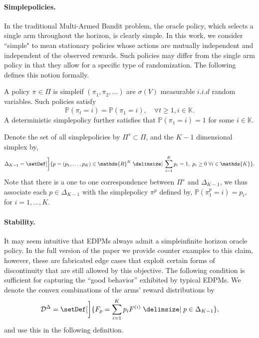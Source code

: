 \documentclass[final,12pt]{colt2018}
\newcommand{\prn}[1]{\left( #1 \right)}
\newcommand{\RR}[1][]{\mathds{R}^{#1}}
\newcommand{\PP}[1]{\mathbb{P}\prn{#1}}
\newcommand{\simple}{simple}
\newcommand{\Simple}{Simple}
\newcommand{\simpleDet}{deterministic simple}
\newcommand{\EDRMabbrv}{EDPM}
\newcommand{\policiesSet}{\Pi}
\newcommand{\statPoliciesSet}{\Pi^s}
\newcommand{\policy}[1][]{\pi^{#1}}
\newcommand{\policyAt}[2][]{\policy[#1]_{#2}}
\newcommand{\statPolicy}[1][p]{\pi^{#1}}
\newcommand{\statPolicyAt}[2][p]{\statPolicy[#1]_{#2}}
\newcommand{\Fp}[1][p]{F_{#1}}
\newcommand{\Fi}[1][i]{F^{\prn{{#1}}}}
\newcommand{\simplex}{\Delta_{K-1}}
\newcommand{\DistSet}{\mathcal{D}}
\newcommand{\DistSetDelta}{\DistSet^{\Delta}}
\newcommand{\actionSet}{\mathds{K}}
\begin{document}
	\paragraph{\Simple\space policies.} In the traditional Multi-Armed Bandit problem, the oracle policy, which selects a single arm throughout the horizon, is clearly \simple. In this work, we consider ``\simple" to mean stationary policies whose actions are mutually independent and independent of the observed rewards. Such policies may differ from the single arm policy in that they allow for a specific type of randomization. The following defines this notion formally. 
	\begin{definition}[\Simple\space policy]
		A policy $\policy \in \policiesSet$ is \simple\space if $\prn{\policyAt{1}, \policyAt{2},\ldots}$ are $\sigma\prn{V}$ measurable $i.i.d$ random variables. Such policies satisfy
		\begin{equation*}
		\PP{\policyAt{t} = i}
		= \PP{\policyAt{1} = i}
		, \quad \forall t \ge 1,i \in \actionSet.
		\end{equation*}
		A \simpleDet\space policy further satisfies that $\PP{\policyAt{1} = i} =1$ for some $i \in \actionSet$.
	\end{definition}
	Denote the set of all \simple\space policies by $\statPoliciesSet \subset \policiesSet$, and the $K-1$ dimensional simplex by,
	\begin{equation*}
	\simplex = \setDef[\bigg]{p = \prn{p_1, \ldots, p_K} \in \RR[K] \given 		\sum_{i=1}^{K}p_i = 1 ,~ p_i \ge 0 ~ \forall i \in \actionSet}.
	\end{equation*}
	Note that there is a one to one correspondence between $\statPoliciesSet$ and $\simplex$, we thus associate each $p \in \simplex$ with the \simple\space policy $\statPolicy$ defined by,	$\PP{\statPolicyAt{1} = i} = p_i,$ for $i = 1,\ldots,K$.
	
	\paragraph{Stability.} It may seem intuitive that \EDRMabbrv s always admit a \simple\space infinite horizon oracle policy. In the full version of the paper we provide counter examples to this claim, however, these are fabricated edge cases that exploit certain forms of discontinuity that are still allowed by this objective. The following condition is sufficient for capturing the ``good behavior'' exhibited by typical \EDRMabbrv s. We denote the convex combinations of the arms' reward distributions by
	\begin{equation} \label{eq:distSetDeltaDef}
		\DistSetDelta = \setDef[\bigg]{\Fp = \sum_{i=1}^{K}{p_{i} \Fi} \given p \in \simplex},
	\end{equation}
	and use this in the following definition.
	
\end{document}
